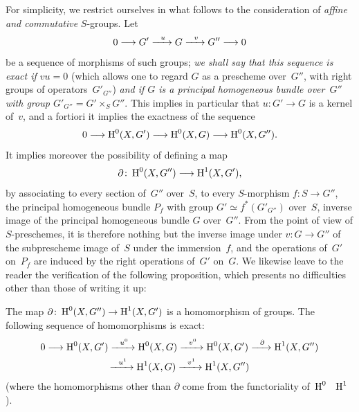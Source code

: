For simplicity, we restrict ourselves in what follows to the
consideration of \emph{affine and commutative} $S$-groups. Let
$$
0\to G'\lto{u} G\lto{v}G''\to 0
$$
be a sequence of morphisms of such groups; \emph{we shall say that this
sequence is exact if $vu=0$} (which allows one to regard $G$
as a prescheme over~$G''$, with right groups of operators~$G'_{G''}$) \emph{and if $G$ is a principal homogeneous
bundle
over~$G''$ with group $G'_{G''}=G'\times_S G''$}. This implies in
particular that $u\colon G'\to G$ is a kernel of~$v$, and a fortiori
it implies the exactness of the sequence
$$0\to\H^0(X,G')\to\H^0(X,G)\to\H^0(X,G'').$$ It implies moreover the
possibility of defining a map
$$
\partial\colon\H^0(X,G'')\to\H^1(X,G')\quoi,
$$
by associating to every section of~$G''$ over~$S$, \ie to every
$S$-morphism $f\colon S\to G''$, the principal homogeneous bundle
$P_f$ with group $G'\simeq f^*(G'_{G''})$ over~$S$, inverse image of the
principal homogeneous bundle $G$ over~$G''$. From the point of view of
$S$-preschemes, it is therefore nothing but the inverse image under
$v\colon G\to G''$ of the subprescheme image of~$S$ under
the immersion~$f$, and the operations of~$G'$ on~$P_f$ are induced
by the right operations of~$G'$
on~$G$.
We likewise leave to the reader the verification of the
following proposition, which presents no difficulties
other than those of writing it up:

\begin{proposition}
\label{XI.4.5}
The map $\partial\colon \H^0(X,G'')\to\H^1(X,G')$ is a
homomorphism of groups. The following sequence of homomorphisms is
exact:
\begin{multline*}
0\to\H^0(X,G')\lto{u^0}\H^0(X,G)\lto{v^0}\H^0(X,G')\lto{\partial}\H^1(X,G'')\\
\lto{u^1}\H^1(X,G) \lto{v^1}\H^1(X,G'')
\end{multline*}
(where the homomorphisms other than $\partial$ come from the
functoriality of~$\operatorname{H}^0$ \resp~$\operatorname{H}^1$).
\end{proposition}

